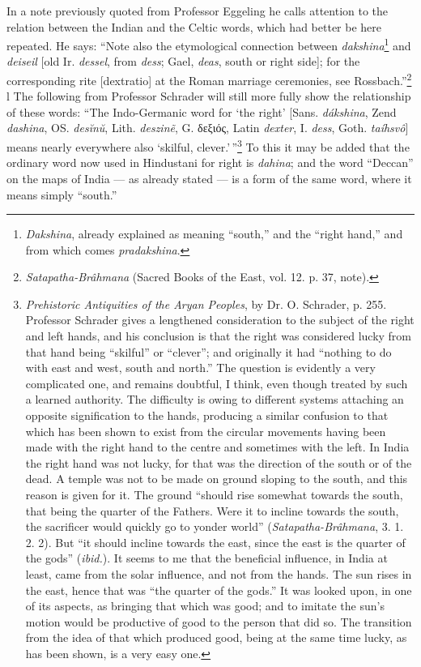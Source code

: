 \documentclass[a4paper, 11pt, oneside, polutonikogreek, english]{article}
\begin{document}
In a note previously quoted from Professor Eggeling he calls attention to the relation between the Indian and the Celtic words, which had better be here repeated. He says: ``Note also the etymological connection between \emph{dakshina}\footnote{\emph{Dakshina}, already explained as meaning ``south,'' and the ``right hand,'' and from which comes \emph{pradakshina}.} and \emph{deiseil} [old Ir. \emph{dessel}, from \emph{dess}; Gael, \emph{deas}, south or right side]; for the corresponding rite [dextratio] at the Roman marriage ceremonies, see Rossbach.''\footnote{\emph{Satapatha-Brâhmana} (Sacred Books of the East, vol. 12. p. 37, note).} l The following from Professor Schrader will still more fully show the relationship of these words: ``The Indo-Germanic word for `the right' [Sans. \emph{dákshina}, Zend \emph{dashina}, OS. \emph{desĭnŭ}, Lith. \emph{deszin\~{e}}, G. δεξιός, Latin \emph{dexter}, I. \emph{dess}, Goth. \emph{taíhsvô}] means nearly everywhere also `skilful, clever.'\,''\footnote{\emph{Prehistoric Antiquities of the Aryan Peoples}, by Dr. O. Schrader, p. 255. Professor Schrader gives a lengthened consideration to the subject of the right and left hands, and his conclusion is that the right was considered lucky from that hand being ``skilful'' or ``clever''; and originally it had ``nothing to do with east and west, south and north.'' The question is evidently a very complicated one, and remains doubtful, I think, even though treated by such a learned authority. The difficulty is owing to different systems attaching an opposite signification to the hands, producing a similar confusion to that which has been shown to exist from the circular movements having been made with the right hand to the centre and sometimes with the left. In India the right hand was not lucky, for that was the direction of the south or of the dead. A temple was not to be made on ground sloping to the south, and this reason is given for it. The ground ``should rise somewhat towards the south, that being the quarter of the Fathers. Were it to incline towards the south, the sacrificer would quickly go to yonder world'' (\emph{Satapatha-Brâhmana}, 3. 1. 2. 2). But ``it should incline towards the east, since the east is the quarter of the gods'' (\emph{ibid.}). It seems to me that the beneficial influence, in India at least, came from the solar influence, and not from the hands. The sun rises in the east, hence that was ``the quarter of the gods.'' It was looked upon, in one of its aspects, as bringing that which was good; and to imitate the sun's motion would be productive of good to the person that did so. The transition from the idea of that which produced good, being at the same time lucky, as has been shown, is a very easy one.} To this it may be added that the ordinary word now used in Hindustani for right is \emph{dahina}; and the word ``Deccan'' on the maps of India --- as already stated --- is a form of the same word, where it means simply ``south.''
\end{document}

